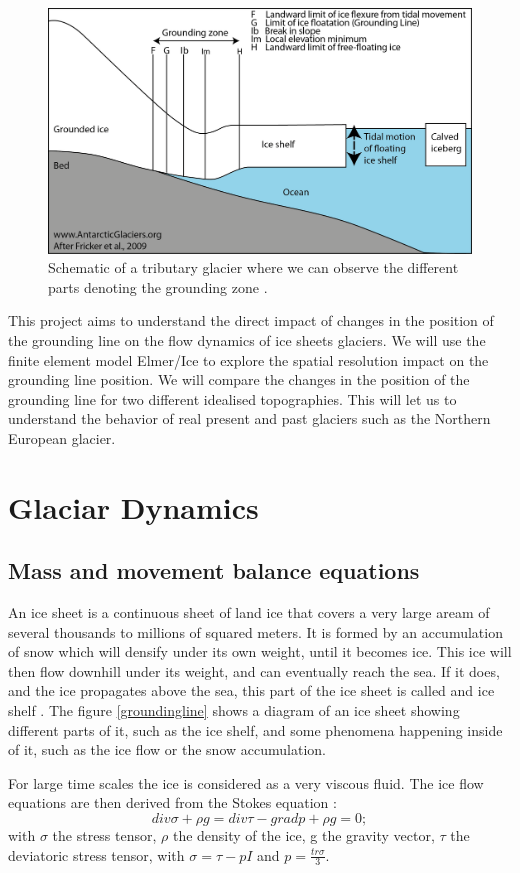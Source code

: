 \documentclass[a4paper,12pt]{article}
\begin{document}
\begin{figure}[!h]
	\centering
	\includegraphics[width=0.7\linewidth]{../fig/groundingzone}
	\caption{Schematic of a tributary glacier where we can observe the different parts denoting the grounding zone \cite[]{fricker2009mapping}.}
	\label{groundingzone}
\end{figure}

 This project aims to understand the direct impact of changes in the position of the grounding line on the flow dynamics of ice sheets glaciers. We will use the finite element model Elmer/Ice to explore the spatial resolution impact on the grounding line position. We will compare the changes in the position of the grounding line for two different idealised topographies. This will let us to understand the behavior of real present and past glaciers such as the Northern European glacier. 

\section{Glaciar Dynamics}
\subsection{Mass and movement balance equations}
An ice sheet is a continuous sheet of land ice that covers a very large aream of several thousands to millions of squared meters. It is formed by an accumulation of snow which will densify under its own weight, until it becomes ice. This ice will then flow downhill under its weight, and can eventually reach the sea. If it does, and the ice propagates above the sea, this part of the ice sheet is called and ice shelf \cite[]{hutter1982mathematical}. The figure \ref{groundingline} shows a diagram of an ice sheet showing different parts of it, such as the ice shelf, and some phenomena happening inside of it, such as the ice flow or the snow accumulation.

For large time scales the ice is considered as a very viscous fluid. The ice flow equations are then derived from the Stokes equation \cite[]{hutter1982mathematical}:
\begin{equation}
	div\sigma + \rho g = div\tau - gradp + \rho g = 0;
\end{equation}
with $\sigma$ the stress tensor, $\rho$ the density of the ice, g the gravity vector, $\tau$ the deviatoric stress tensor, with $\sigma = \tau - pI$ and $p=\frac{tr\sigma}{3}$. 
\end{document}
